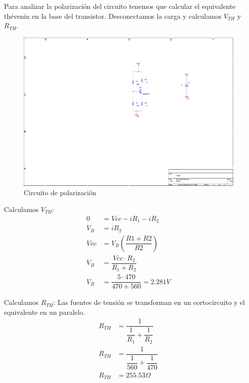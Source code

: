 Para analizar la polarización del circuito tenemos que calcular el
equivalente thévenin en la base del transistor. Desconectamos la carga
y calculamos $V_{TH}$ y $R_{TH}$.

  \begin{figure}[H]
    \centering  
    \includegraphics[scale=1,page=1,clip, trim=8cm 9.5cm 5cm 3.5cm]{images/circuito_sin_bias_point.pdf}
    \caption{Circuito de polarización}
  \end{figure}

Calculamos $V_{TH}$:
\begin{equation}
  \begin{split}
    0 &= Vcc - iR_1-iR_2\\
    V_B &= iR_2\\
    Vcc &= V_B\left(\dfrac{R1+R2}{R2}\right)\\
    V_B &= \dfrac{Vcc \cdot R_2}{R_1+R_2}\\
    V_B &= \dfrac{5 \cdot 470}{470+560} = 2.281 V
  \end{split}
\end{equation}

Calculamos $R_{TH}$:
Las fuentes de tensión se transforman en un cortocircuito y el
equivalente en un paralelo.
\begin{equation}
  \begin{split}
    R_{TH} &= \dfrac{1}{\dfrac{1}{R_1}+\dfrac{1}{R_2}}\\
    R_{TH} &= \dfrac{1}{\dfrac{1}{560}+\dfrac{1}{470}}\\
    R_{TH} &= 255.53 \Omega
  \end{split}
\end{equation}

